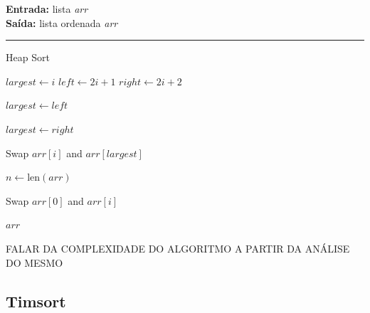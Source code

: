 \documentclass[conference]{IEEEtran}
\begin{document}
\begin{algorithm}[H]
    \raggedright
    \vspace{.1em}
    \textbf{Entrada:} lista \textit{arr} \\
    \textbf{Saída:} lista ordenada \textit{arr} \\
    \vspace{.5em}
    \hrule 
    \caption{Heap Sort}
    \begin{algorithmic}[1]
            \State $largest \gets i$
            \State $left \gets 2i + 1$
            \State $right \gets 2i + 2$
    
                \State $largest \gets left$
            \EndIf
    
                \State $largest \gets right$
            \EndIf
    
                \State Swap $arr[i]$ and $arr[largest]$
                \State {}
            \EndIf
        \EndFunction
    
            \State $n \gets \text{len}(arr)$
    
                \State {}
            \EndFor
    
                \State Swap $arr[0]$ and $arr[i]$
                \State {}
            \EndFor
    
            \State \Return $arr$
        \EndFunction
    
        \State {}
    \end{algorithmic}
\end{algorithm}

FALAR DA COMPLEXIDADE DO ALGORITMO A PARTIR DA ANÁLISE DO MESMO

\subsection{Timsort}
\end{document}
